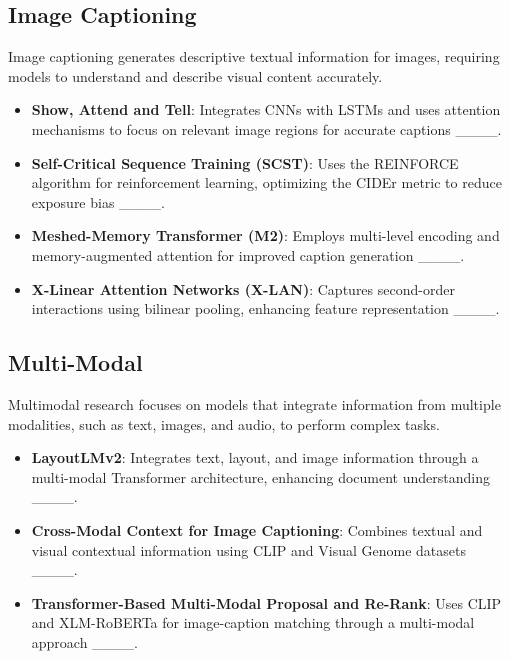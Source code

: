 \subsection{Image Captioning}
Image captioning generates descriptive textual information for images, requiring models to understand and describe visual content accurately.

\begin{itemize}
    \item \textbf{Show, Attend and Tell}: Integrates CNNs with LSTMs and uses attention mechanisms to focus on relevant image regions for accurate captions ____.
    \item \textbf{Self-Critical Sequence Training (SCST)}: Uses the REINFORCE algorithm for reinforcement learning, optimizing the CIDEr metric to reduce exposure bias ____.
    \item \textbf{Meshed-Memory Transformer (M2)}: Employs multi-level encoding and memory-augmented attention for improved caption generation ____.
    \item \textbf{X-Linear Attention Networks (X-LAN)}: Captures second-order interactions using bilinear pooling, enhancing feature representation ____.
\end{itemize}
\subsection{Multi-Modal}
Multimodal research focuses on models that integrate information from multiple modalities, such as text, images, and audio, to perform complex tasks.

\begin{itemize}
    \item \textbf{LayoutLMv2}: Integrates text, layout, and image information through a multi-modal Transformer architecture, enhancing document understanding ____.
    \item \textbf{Cross-Modal Context for Image Captioning}: Combines textual and visual contextual information using CLIP and Visual Genome datasets ____.
    \item \textbf{Transformer-Based Multi-Modal Proposal and Re-Rank}: Uses CLIP and XLM-RoBERTa for image-caption matching through a multi-modal approach ____.
\end{itemize}

